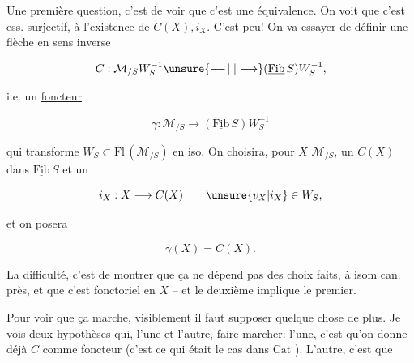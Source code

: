 
Une première question, c'est de voir que c'est une équivalence. On voit que c'est ess. surjectif,  à l'existence de $C(X),i_X$. C'est peu! On va essayer de définir une flèche en sens inverse

\[
\bar C:\mathcal M_{/S}W_S^{-1}\unsure{\mathrel{\relbar\joinrel\relbar\joinrel\vert}|\longrightarrow}(\underline{\mathrm{Fib}}\,S)W_S^{-1},
\]

i.e. un \uline{foncteur}

\[
\gamma:\mathcal M_{/S}\longrightarrow(\underline{\mathrm{Fib}}\,S)W_S^{-1}
\]

qui transforme $W_S\subset\mathrm{Fl}\,(\mathcal M_{/S})$ en iso. On choisira, pour $X$  $\mathcal M_{/S}$, un $C(X)$ dans $\underline{\mathrm{Fib}}\,S$ et un

\[
i_X:X\longrightarrow C(X)\qquad \unsure{v_X|i_X}\in W_S,
\]

et on posera

\[
\gamma(X)=C(X).
\]

La difficulté, c'est de montrer que ça ne dépend pas des choix faits, à isom can. près, et que c'est fonctoriel en $X$ -- et le deuxième implique le premier.

Pour voir que ça marche, visiblement il faut supposer quelque chose de plus. Je vois deux hypothèses qui, l'une et l'autre,  faire marcher: l'une, c'est qu'on  donne déjà $C$ comme foncteur  (c'est ce qui était le cas dans $\mathrm{Cat}$ ). L'autre, c'est que
